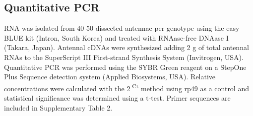 \subsection*{Quantitative PCR}

RNA was isolated from 40-50 dissected antennae per genotype using the easy-BLUE kit (Intron, South Korea) and treated with RNAase-free DNAase I (Takara, Japan). Antennal cDNAs were synthesized adding 2 \mu{}g of total antennal RNAs to the SuperScript III First-strand Synthesis System (Invitrogen, USA). Quantitative PCR was performed using the SYBR Green reagent on a StepOne Plus Sequence detection system (Applied Biosystems, USA). Relative concentrations were calculated with the 2\textsuperscript{-\Delta{}\Delta{}Ct} method using rp49 as a control and statistical significance was determined using a t-test. Primer sequences are included in Supplementary Table 2.
